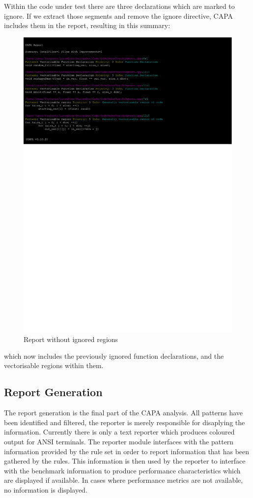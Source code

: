 Within the code under test there are three declarations which are marked to ignore. If we extract
those segments and remove the ignore directive, CAPA includes them in the report, resulting in this
summary:
\begin{figure}[H]
\includegraphics[clip,trim=0cm 19cm 4cm 0.5cm,width=\textwidth]{./Misc/removedIgnore.pdf}
\caption{Report without ignored regions}
\end{figure}
which now includes the previously ignored function declarations, and the vectorisable regions within
them.

\subsection{Report Generation}
The report generation is the final part of the CAPA analysis. All patterns have been identified and
filtered, the reporter is merely responsible for disaplying the information. Currently there is only
a text reporter which produces coloured output for ANSI terminals. The reporter module interfaces
with the pattern information provided by the rule set in order to report information that has been
gathered by the rules. This information is then used by the reporter to interface with the benchmark
information to produce performance characteristics which are displayed if available. In cases where
performance metrics are not available, no information is displayed.




